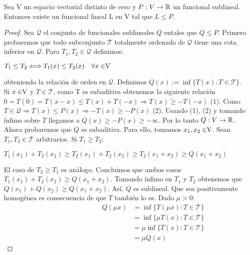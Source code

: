 	\begin{teoremaBox}\label{H-B}
		Sea V un espacio vectorial distinto de cero y $P:V \rightarrow \mathbb{R}$ un funcional sublineal. Entonces existe un funcional lineal L en V tal que $ L \leq P $.
	\end{teoremaBox}
	\begin{proof}
		Sea $ \mathcal{Q} $ el conjunto de funcionales sublineales $ Q $ en\vecSpace tales que $ Q \leq P $. Primero probaremos que todo subconjunto $ \mathcal{T} $ totalmente ordenado de $ \mathcal{Q} $ tiene una cota inferior en $ \mathcal{Q} $. Para $ T_1 ,T_2 \in \mathcal{Q} $ definimos:
		\begin{center}
			$ T_1 \leq T_2 \Longleftrightarrow T_1 (x) \leq T_2 (x) \quad \forall x \in \vecSpace $
		\end{center}
		
		obteniendo la relación de orden en  $ \mathcal{Q} $. Definimos $ Q(x):=\inf \{ T(x): T \in \mathcal{T} \} $. Si $ x \in \vecSpace $ y $ T \in \mathcal{T} $, como T es subaditiva obtenemos la siguiente relación $ 0 = T(0) = T(x-x) \leq T(x) + T(-x) \Longrightarrow T(x) \geq -T(-x) $ (1). Como $ T \in \mathcal{Q} \Longrightarrow T(x) \leq P(x) \Longrightarrow -T(x) \geq -P(x)$ (2). Usando (1), (2) y tomando ínfimo sobre $  T $  llegamos a $ Q(x) \geq -P(x) \geq - \infty $. Por lo tanto $ Q:V \rightarrow \mathbb{R}$. \\
		
		Ahora probaremos que $ Q $ es subaditiva. Para ello, tomamos $ x_1, x_2\in \vecSpace $. Sean $ T_1 , T_2 \in \mathcal{T} $ arbitrarios. Si $ T_1 \geq T_2 $:
		
		\begin{center}
			$ T_1 (x_1)+  T_2 (x_2) \geq T_2(x_1)+  T_2 (x_2) \geq T_2(x_1 +x_2) \geq Q(x_1 + x_2)$
		\end{center}
		
		El caso de $ T_2 \geq T_1 $ es análogo. Concluimos que ambos casos $ T_1 (x_1)+  T_2 (x_2) \geq Q(x_1 + x_2)$. Tomando ínfimo en $ T_1 $ y $ T_2 $ obtenemos que $ Q (x_1)+  Q(x_2) \geq Q(x_1 + x_2)$. Así, $ Q $ es sublineal. Que sea positivamente homogénea es consecuencia de que $ T $ también lo es. Dado $ \mu > 0 $:
		\begin{equation*}
		\begin{split}
		\qquad \qquad \qquad \qquad 
		Q(\mu x) &=\inf \{ T(\mu x): T \in \mathcal{T} \} \\ 
		& = \inf \{ \mu T( x): T \in \mathcal{T} \} \\ 
		&= \mu\inf \{ T( x): T \in \mathcal{T} \} \\ 
		&= \mu Q(x) 
		\end{split}
		\end{equation*}
		

\end{proof}
